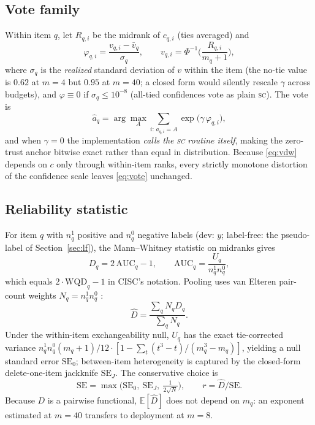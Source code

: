 \documentclass{article}
\newcommand{\Dhat}{\widehat{D}}
\newcommand{\SC}{\textsc{sc}}
\begin{document}
\subsection{Vote family}
Within item $q$, let $R_{q,i}$ be the midrank of $c_{q,i}$ (ties averaged) and
\begin{equation}\label{eq:vdw}
\varphi_{q,i}=\frac{v_{q,i}-\bar v_q}{\sigma_q},\qquad v_{q,i}=\Phi^{-1}\!\Big(\frac{R_{q,i}}{m_q+1}\Big),
\end{equation}
where $\sigma_q$ is the \emph{realized} standard deviation of $v$ within the item (the no-tie value is $0.62$ at $m{=}4$ but $0.95$ at $m{=}40$; a closed form would silently rescale $\gamma$ across budgets), and $\varphi\equiv 0$ if $\sigma_q\le 10^{-8}$ (all-tied confidences vote as plain \SC). The vote is
\begin{equation}\label{eq:vote}
\hat a_q=\arg\max_A \sum_{i:\,a_{q,i}=A}\exp\big(\gamma\,\varphi_{q,i}\big),
\end{equation}
and when $\gamma=0$ the implementation \emph{calls the \SC{} routine itself}, making the zero-trust anchor bitwise exact rather than equal in distribution. Because \eqref{eq:vdw} depends on $c$ only through within-item ranks, every strictly monotone distortion of the confidence scale leaves \eqref{eq:vote} unchanged.

\subsection{Reliability statistic}
For item $q$ with $n^1_q$ positive and $n^0_q$ negative labels (dev: $y$; label-free: the pseudo-label of Section~\ref{sec:lf}), the Mann--Whitney statistic on midranks gives
\begin{equation}
D_q = 2\,\mathrm{AUC}_q-1,\qquad \mathrm{AUC}_q=\frac{U_q}{n^1_q n^0_q},
\end{equation}
which equals $2\cdot\mathrm{WQD}_q-1$ in CISC's notation. Pooling uses van Elteren pair-count weights $N_q=n^1_q n^0_q$ \citep{vanelteren1960}:
\begin{equation}\label{eq:pooled}
\Dhat=\frac{\sum_q N_q D_q}{\sum_q N_q}.
\end{equation}
Under the within-item exchangeability null, $U_q$ has the exact tie-corrected variance $n^1_qn^0_q(m_q{+}1)/12\cdot[1-\sum_t(t^3-t)/(m_q^3-m_q)]$, yielding a null standard error $\mathrm{SE}_0$; between-item heterogeneity is captured by the closed-form delete-one-item jackknife $\mathrm{SE}_J$. The conservative choice is
\begin{equation}
\mathrm{SE}=\max\big(\mathrm{SE}_0,\ \mathrm{SE}_J,\ \tfrac{1}{2\sqrt{N}}\big),\qquad r=\Dhat/\mathrm{SE}.
\end{equation}
Because $D$ is a pairwise functional, $\mathbb{E}[\Dhat]$ does not depend on $m_q$: an exponent estimated at $m{=}40$ transfers to deployment at $m{=}8$.
\end{document}
